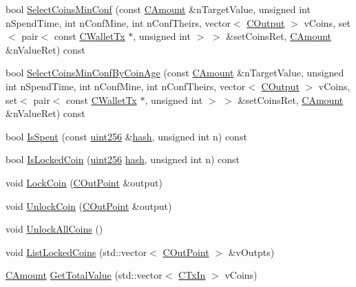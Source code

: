 \begin{DoxyCompactItemize}
\item 
bool \hyperlink{class_c_wallet_a6938211ba1e8ab9de20b8c7071c444a4}{Select\+Coins\+Min\+Conf} (const \hyperlink{amount_8h_a4eaf3a5239714d8c45b851527f7cb564}{C\+Amount} \&n\+Target\+Value, unsigned int n\+Spend\+Time, int n\+Conf\+Mine, int n\+Conf\+Theirs, vector$<$ \hyperlink{class_c_output}{C\+Output} $>$ v\+Coins, set$<$ pair$<$ const \hyperlink{class_c_wallet_tx}{C\+Wallet\+Tx} $\ast$, unsigned int $>$ $>$ \&set\+Coins\+Ret, \hyperlink{amount_8h_a4eaf3a5239714d8c45b851527f7cb564}{C\+Amount} \&n\+Value\+Ret) const 
\item 
bool \hyperlink{class_c_wallet_a119e378349dcbcada447b4343805326d}{Select\+Coins\+Min\+Conf\+By\+Coin\+Age} (const \hyperlink{amount_8h_a4eaf3a5239714d8c45b851527f7cb564}{C\+Amount} \&n\+Target\+Value, unsigned int n\+Spend\+Time, int n\+Conf\+Mine, int n\+Conf\+Theirs, vector$<$ \hyperlink{class_c_output}{C\+Output} $>$ v\+Coins, set$<$ pair$<$ const \hyperlink{class_c_wallet_tx}{C\+Wallet\+Tx} $\ast$, unsigned int $>$ $>$ \&set\+Coins\+Ret, \hyperlink{amount_8h_a4eaf3a5239714d8c45b851527f7cb564}{C\+Amount} \&n\+Value\+Ret) const 
\item 
bool \hyperlink{class_c_wallet_a7d77e683a0f10403fe2b67385895d497}{Is\+Spent} (const \hyperlink{classuint256}{uint256} \&\hyperlink{cache_8cc_a11ecb029164e055f28f4123ce3748862}{hash}, unsigned int n) const 
\item 
bool \hyperlink{class_c_wallet_ab85a2574c33ca0f19da06b065d7f1eb5}{Is\+Locked\+Coin} (\hyperlink{classuint256}{uint256} \hyperlink{cache_8cc_a11ecb029164e055f28f4123ce3748862}{hash}, unsigned int n) const 
\item 
void \hyperlink{class_c_wallet_a2be3aa26d84c79bdcabb41c6b3fe0e0f}{Lock\+Coin} (\hyperlink{class_c_out_point}{C\+Out\+Point} \&output)
\item 
void \hyperlink{class_c_wallet_abd60f5b890e2c62c05c6a2de6322197f}{Unlock\+Coin} (\hyperlink{class_c_out_point}{C\+Out\+Point} \&output)
\item 
void \hyperlink{class_c_wallet_ab51d80d53bc30799dd6888868a553963}{Unlock\+All\+Coins} ()
\item 
void \hyperlink{class_c_wallet_a41f4c77a0843692388f8b11d5fb88042}{List\+Locked\+Coins} (std\+::vector$<$ \hyperlink{class_c_out_point}{C\+Out\+Point} $>$ \&v\+Outpts)
\item 
\hyperlink{amount_8h_a4eaf3a5239714d8c45b851527f7cb564}{C\+Amount} \hyperlink{class_c_wallet_a00962341815bf1374067f8ea5520c709}{Get\+Total\+Value} (std\+::vector$<$ \hyperlink{class_c_tx_in}{C\+Tx\+In} $>$ v\+Coins)

\end{DoxyCompactItemize}
